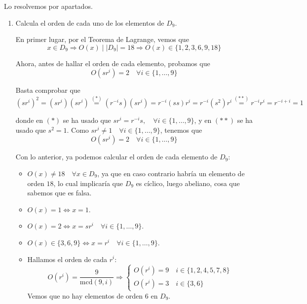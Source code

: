 \documentclass[12pt]{article}
\begin{document}
    \begin{ejercicio}
        Lo resolvemos por apartados.
        \begin{enumerate}[label=(\alph*)]
            \item Calcula el orden de cada uno de los elementos de $D_9$.
            
            En primer lugar, por el Teorema de Lagrange, vemos que $$x \in D_9 \Longrightarrow O(x) \mid |D_9| = 18 \Longrightarrow O(x) \in \{1,2,3,6,9,18\}$$

            Ahora, antes de hallar el orden de cada elemento, probamos que $$O(sr^{i}) = 2 \quad \forall i \in \{1, \ldots, 9\}$$
            
            Basta comprobar que $$(sr^i)^2 = (sr^i)(sr^i) \stackrel{(*)}{=} (r^{-i}s)(sr^i) = r^{-i}(ss)r^i = r^{-i}(s^2)r^i \stackrel{(**)}{=} r^{-i}r^{i} = r^{-i+i} = 1$$

            donde en $(*)$ se ha usado que $sr^i = r^{-i}s, \quad \forall i \in \{1, \ldots, 9\}$, y en $(**)$ se ha usado que $s^2 = 1$. Como $sr^i \neq 1 \quad \forall i \in \{1, \ldots, 9\}$, tenemos que $$O(sr^i) = 2 \quad \forall i \in \{1, \ldots, 9\}$$

            Con lo anterior, ya podemos calcular el orden de cada elemento de $D_9$:

            \begin{itemize}
                \item $O(x) \neq 18 \quad \forall x \in D_9$, ya que en caso contrario habría un elemento de orden $18$, lo cual implicaría que $D_9$ es cíclico, luego abeliano, cosa que sabemos que es falsa.
                \item $O(x) = 1 \iff x = 1$.
                \item $O(x) = 2 \iff x = sr^i \quad \forall i \in \{1, \ldots, 9\}$.
                \item $O(x) \in \{3,6,9\} \iff x = r^i \quad \forall i \in \{1, \ldots, 9\}$.
                \item Hallamos el orden de cada $r^{i}$: $$O(r^i) = \dfrac{9}{\text{mcd}(9,i)} \Longrightarrow \begin{cases}
                    O(r^i) = 9 \quad i \in \{1,2,4,5,7,8\} \\
                    O(r^i) = 3 \quad i \in \{3,6\}
                \end{cases}$$
                Vemos que no hay elementos de orden $6$ en $D_9$.
            \end{itemize}


\end{enumerate}
\end{ejercicio}
\end{document}
